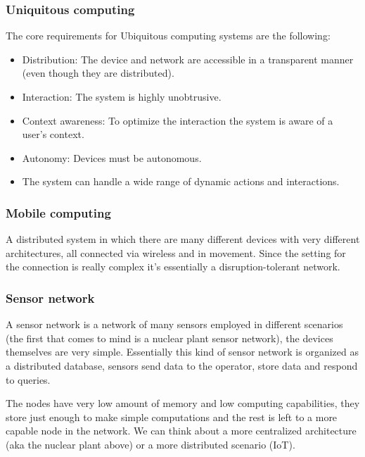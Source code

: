 \subsubsection{Uniquitous computing}
The core requirements for Ubiquitous computing systems are the following:
\begin{itemize}
	\item Distribution: The device and network are accessible in a transparent manner (even though they are distributed).
	\item Interaction: The system is highly unobtrusive.
	\item Context awareness: To optimize the interaction the system is aware of a user's context.
	\item Autonomy: Devices must be autonomous.
	\item The system can handle a wide range of dynamic actions and interactions.
\end{itemize}
\subsubsection{Mobile computing}
A distributed system in which there are many different devices with very different architectures, all connected via wireless and in movement. Since the setting for the connection is really complex it's essentially a disruption-tolerant network.
\subsubsection{Sensor network}
A sensor network is a network of many sensors employed in different scenarios (the first that comes to mind is a nuclear plant sensor network), the devices themselves are very simple. Essentially this kind of sensor network is organized as a distributed database, sensors send data to the operator, store data and respond to queries.

The nodes have very low amount of memory and low computing capabilities, they store just enough to make simple computations and the rest is left to a more capable node in the network. We can think about a more centralized architecture (aka the nuclear plant above) or a more distributed scenario (IoT).
